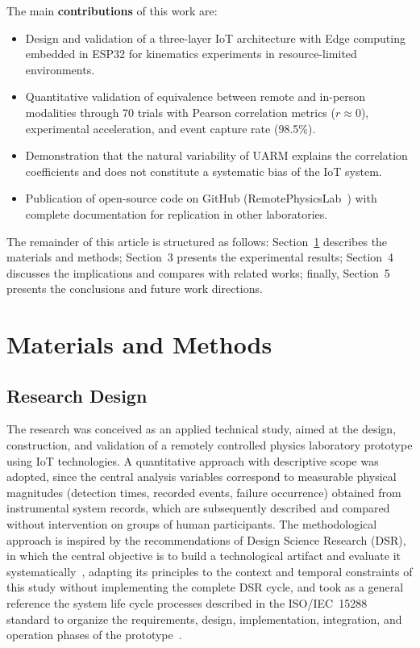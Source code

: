 \documentclass[sensors,article,submit,pdftex]{Definitions/mdpi}
\begin{document}
The main \textbf{contributions} of this work are:
\begin{itemize}
  \item Design and validation of a three-layer IoT architecture with Edge computing embedded in ESP32 for kinematics experiments in resource-limited environments.
  \item Quantitative validation of equivalence between remote and in-person modalities through 70 trials with Pearson correlation metrics ($r \approx 0$), experimental acceleration, and event capture rate (98.5\%).
  \item Demonstration that the natural variability of UARM explains the correlation coefficients and does not constitute a systematic bias of the IoT system.
  \item Publication of open-source code on GitHub (RemotePhysicsLab~\cite{r15}) with complete documentation for replication in other laboratories.
\end{itemize}

The remainder of this article is structured as follows: Section~\ref{sec:metodos} describes the materials and methods; Section~3 presents the experimental results; Section~4 discusses the implications and compares with related works; finally, Section~5 presents the conclusions and future work directions.


\section{Materials and Methods}
\label{sec:metodos}

\subsection{Research Design}

The research was conceived as an applied technical study, aimed at the design, construction, and validation of a remotely controlled physics laboratory prototype using IoT technologies. A quantitative approach with descriptive scope was adopted, since the central analysis variables correspond to measurable physical magnitudes (detection times, recorded events, failure occurrence) obtained from instrumental system records, which are subsequently described and compared without intervention on groups of human participants. The methodological approach is inspired by the recommendations of Design Science Research (DSR), in which the central objective is to build a technological artifact and evaluate it systematically~\cite{r16}, adapting its principles to the context and temporal constraints of this study without implementing the complete DSR cycle, and took as a general reference the system life cycle processes described in the ISO/IEC~15288 standard to organize the requirements, design, implementation, integration, and operation phases of the prototype~\cite{r17}.
\end{document}

